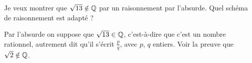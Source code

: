 \begin{question}

Je veux montrer que $\sqrt{13} \notin \mathbb{Q}$ par un raisonnement par l'absurde. Quel schéma de raisonnement est adapté ?
\begin{answers}


    
\end{answers}
\begin{explanations}
Par l'absurde on suppose que $\sqrt{13} \in \mathbb{Q}$, c'est-à-dire que c'est un nombre rationnel, autrement dit qu'il s'écrit $\frac{p}{q}$, avec $p$, $q$ entiers. Voir la preuve que $\sqrt{2} \notin \mathbb{Q}$.
\end{explanations}
\end{question}




